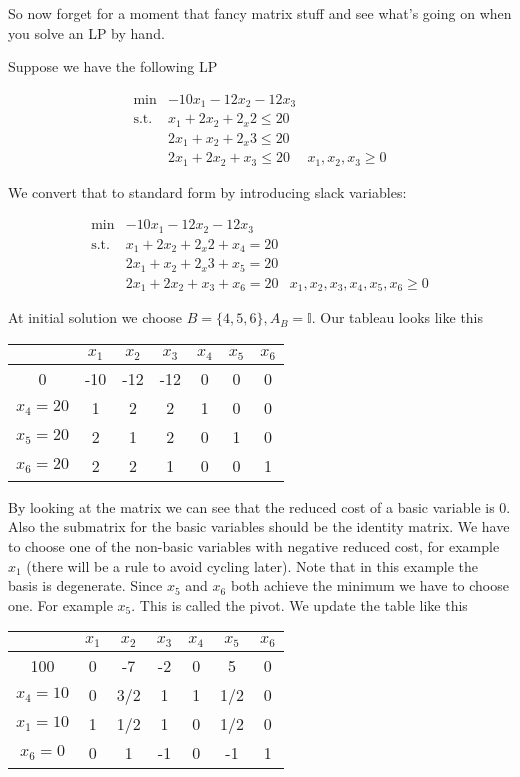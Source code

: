 \begin{Ex} So now forget for a moment that fancy matrix stuff and see what's going on when you solve an LP by hand.

Suppose we have the following LP

\begin{align*}
\min & -10x_1 -12x_2 -12x_3\\
\text{s.t.} & x_1+2x_2 +2_x2\leq 20\\
&2x_1 +x_2+2_x3\leq 20\\
& 2x_1+2x_2 +x_3\leq 20
& x_1,x_2,x_3 \geq 0
\end{align*}

We convert that to standard form by introducing slack variables:

\begin{align*}
\min & -10x_1 -12x_2 -12x_3\\
\text{s.t.} & x_1+2x_2 +2_x2 + x_4 = 20\\
&2x_1 +x_2+2_x3 +x_5 =20\\
& 2x_1+2x_2 +x_3 +x_6 = 20
& x_1,x_2,x_3,x_4,x_5,x_6 \geq 0
\end{align*}

At initial solution we choose $B=\{4,5,6\}, A_B=\mathbb{I}$. Our tableau looks like this

\begin{center}
\begin{tabular}{c|cccccc}
  & $x_1$ & $x_2$ & $x_3$ & $x_4$ & $x_5$ & $x_6$ \\\hline
0 & -10 & -12 & -12 & 0 & 0 & 0\\
$x_4=20$ & 1 & 2 & 2 & 1 &  0 & 0 \\
$x_5=20$ & 2 & 1 & 2 & 0 &  1 & 0\\
$x_6=20$ & 2 & 2 & 1 & 0 &  0 & 1\\
\end{tabular}
\end{center}

By looking at the matrix we can see that the reduced cost of a basic variable is 0. Also the submatrix for the basic variables should be the identity matrix. We have to choose one of the non-basic variables with negative reduced cost, for example $x_1$ (there will be a rule to avoid cycling later). Note that in this example the basis is degenerate. Since $x_5$ and $x_6$ both achieve the minimum we have to choose one. For example $x_5$. This is called the pivot. We update the table like this

\begin{center}
\begin{tabular}{c|cccccc}
  & $x_1$ & $x_2$ & $x_3$ & $x_4$ & $x_5$ & $x_6$ \\\hline
100 & 0 & -7 & -2 & 0 & 5 & 0\\
$x_4=10$ & 0 & 3/2 & 1 & 1 & 1/2 & 0 \\
$x_1=10$ & 1 & 1/2 & 1 & 0 &  1/2 & 0\\
$x_6=0$ & 0 & 1 & -1 & 0 & -1 &  1\\
\end{tabular}
\end{center}


\end{Ex}
